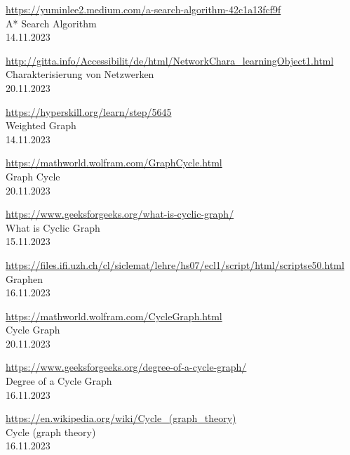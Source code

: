\begin{thebibliography}{999}
    \href{https://yuminlee2.medium.com/a-search-algorithm-42c1a13fcf9f}{https://yuminlee2.medium.com/a-search-algorithm-42c1a13fcf9f}\\
    A* Search Algorithm\\
    14.11.2023
    
    \href{http://gitta.info/Accessibilit/de/html/NetworkChara_learningObject1.html}{http://gitta.info/Accessibilit/de/html/NetworkChara\_learningObject1.html}\\
    Charakterisierung von Netzwerken\\
    20.11.2023
    
    \href{https://hyperskill.org/learn/step/5645}{https://hyperskill.org/learn/step/5645}\\
    Weighted Graph\\
    14.11.2023
    
    \href{https://mathworld.wolfram.com/GraphCycle.html}{https://mathworld.wolfram.com/GraphCycle.html}\\
    Graph Cycle\\
    20.11.2023
    
    \href{https://www.geeksforgeeks.org/what-is-cyclic-graph/}{https://www.geeksforgeeks.org/what-is-cyclic-graph/}\\
    What is Cyclic Graph\\
    15.11.2023
    
    \href{https://files.ifi.uzh.ch/cl/siclemat/lehre/hs07/ecl1/script/html/scriptse50.html}{https://files.ifi.uzh.ch/cl/siclemat/lehre/hs07/ecl1/script/html/scriptse50.html}\\
    Graphen\\
    16.11.2023
    
    \href{https://mathworld.wolfram.com/CycleGraph.html}{https://mathworld.wolfram.com/CycleGraph.html}\\
    Cycle Graph\\
    20.11.2023
    
    \href{https://www.geeksforgeeks.org/degree-of-a-cycle-graph/}{https://www.geeksforgeeks.org/degree-of-a-cycle-graph/}\\
    Degree of a Cycle Graph\\
    16.11.2023
    
    \href{https://en.wikipedia.org/wiki/Cycle_(graph_theory)}{https://en.wikipedia.org/wiki/Cycle\_(graph\_theory)}\\
    Cycle (graph theory)\\
    16.11.2023
    

\end{thebibliography}
